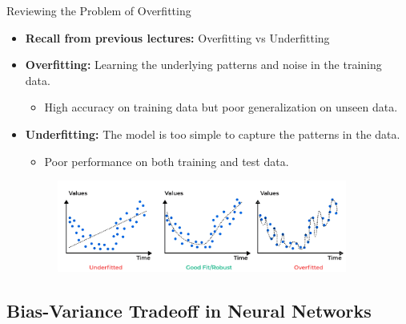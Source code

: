 \documentclass[serif, aspectratio=169]{beamer}
\begin{document}
\begin{frame}{Reviewing the Problem of Overfitting}
    \begin{itemize} 
    
        \item \textbf{Recall from previous lectures:} Overfitting vs Underfitting
        
        \item \textbf{Overfitting:} Learning the underlying patterns and noise in the training data.
        \begin{itemize}
            \item High accuracy on training data but poor generalization on unseen data.
        \end{itemize}  

        \item \textbf{Underfitting:} The model is too simple to capture the patterns in the data.
        \begin{itemize}
            \item Poor performance on both training and test data.
        \end{itemize}

        \begin{figure}
                \includegraphics[width=0.9\textwidth]{pic/overfitting-vs-underfitting__AIE.png}
                \label{fig:overfitting-vs-underfitting}
        \end{figure}

    \end{itemize} 
\end{frame}


\subsection{Bias-Variance Tradeoff in Neural Networks}
\end{document}
